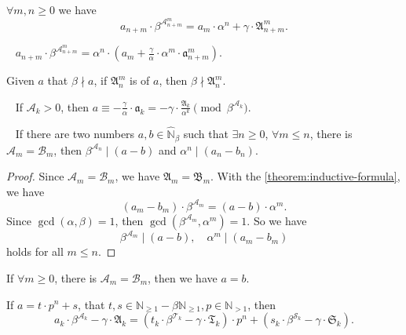 \begin{corollary}
$\forall m, n \ge 0$ we have
\[ a_{n+m} \cdot \beta^{\mathcal{A}_{n+m}^{m}} = a_{m} \cdot\alpha^{n} + \gamma\cdot\mathfrak{A}_{n+m}^{m}. \]
\end{corollary}
\begin{corollary}~\label{corollary:inductive-formula-with-reduced}
    $a_{n+m} \cdot \beta^{\mathcal{A}_{n+m}^{m}} = \alpha^{n}\cdot\left(a_m + \frac{\gamma}{\alpha}\cdot\alpha^{m}\cdot\mathfrak{a}_{n+m}^{m}\right)$.
\end{corollary}
\begin{corollary}
Given $a$ that $\beta \nmid a$, if $\mathfrak{A}_n^m$ is of $a$, then $\beta \nmid \mathfrak{A}_n^m$.
\end{corollary}
\begin{corollary}~\label{corollary:congerunce-with-collatz-complement}
If $\mathcal{A}_k > 0$, then $a \equiv - \frac{\gamma}{\alpha}\cdot\mathfrak{a}_k = -\gamma \cdot \frac{\mathfrak{A}_k}{\alpha^k} \pmod{\beta^{\mathcal{A}_k}}$.
\end{corollary}
\begin{corollary}[Co-uniqueness]~\label{cor:co-uniqueness}
    If there are two numbers $a, b \in \widehat{\mathbb{N}}_{{\beta}}$ such that $\exists n \ge 0$, $\forall m \le n$, there is $\mathcal{A}_m = \mathcal{B}_m$, then $\beta^{\mathcal{A}_n} \mid (a - b)$ and $\alpha^{n} \mid (a_n - b_n)$.
\end{corollary}
\begin{proof}
    Since $\mathcal{A}_m = \mathcal{B}_m$, we have $\mathfrak{A}_{m} = \mathfrak{B}_{m}$.
    With the \cref{theorem:inductive-formula}, we have
    \[ (a_{m} - b_{m}) \cdot \beta^{\mathcal{A}_m} = (a - b) \cdot \alpha^{m}. \]
    Since $\gcd(\alpha, \beta) = 1$, then $\gcd(\beta^{\mathcal{A}_m}, \alpha^{m}) = 1$.
    So we have
    \[\beta^{\mathcal{A}_m} \mid (a - b), \quad \alpha^{m} \mid (a_m - b_m) \]
    holds for all $m\le n$.
\end{proof}
\begin{corollary}
    If $\forall m \ge 0$, there is $\mathcal{A}_m = \mathcal{B}_m$, then we have $a = b$.
\end{corollary}
\begin{corollary}
    If $a = t \cdot p^n + s$, that $t, s\in \mathbb{N}_{\ge1} - \beta\mathbb{N}_{\ge1}, p \in \mathbb{N}_{>1}$, then
    \[a_k \cdot \beta^{\mathcal{A}_k} - \gamma\cdot\mathfrak{A}_k = (t_k \cdot \beta^{\mathcal{T}_k} - \gamma\cdot\mathfrak{T}_k)\cdot p^{n} + (s_k \cdot \beta^{\mathcal{S}_k} - \gamma\cdot\mathfrak{S}_k).\]
\end{corollary}
